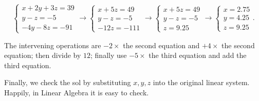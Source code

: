 \[\left\{ \begin{matrix}
{x + 2y + 3z = 39} \\
{y - z = - 5} \\
{- 4y - 8z = - 91}
\end{matrix} \right.\rightarrow\left\{ \begin{matrix}
{x + 5z = 49} \\
{y - z = - 5} \\
{- 12z = - 111}
\end{matrix} \right.\rightarrow\left\{ \begin{matrix}
{x + 5z = 49} \\
{y - z = - 5} \\
{z = 9.25}
\end{matrix} \right.\rightarrow\left\{ \begin{matrix}
{x = 2.75} \\
{y = 4.25} \\
{z = 9.25}
\end{matrix} \right..\]

The intervening operations are \(- 2 \times\) the second equation and \(+ 4 \times\) the second equation; then divide by \(12\); finally use \(- 5 \times\) the third equation and add the third equation.

Finally, we check the sol by substituting \(x,y,z\) into the original linear system. Happily, in Linear Algebra it is easy to check.
